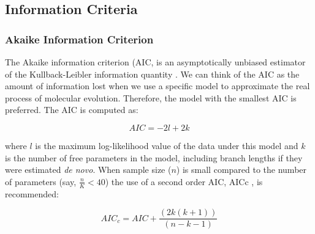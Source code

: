%
%
%
%

\subsection{Information Criteria}
\subsubsection{Akaike Information Criterion}
\label{sec:aic}

The Akaike information criterion (AIC, \citep{Akaike-1974} is an asymptotically
unbiased estimator of the Kullback-Leibler information quantity \citep{Kullback-1951}.
We can think of the AIC as the amount of information lost when we use a specific model
to approximate the real process of molecular evolution.
Therefore, the model with the smallest AIC is preferred. The AIC is computed as:

\[
AIC=-2l+2k
\]

where $l$ is the maximum log-likelihood value of the data under this model and $k$
is the number of free parameters in the model,
including branch lengths if they were estimated \emph{de novo}.
When sample size ($n$) is small compared to the number of parameters (say, $\frac{n}{K} < 40$)
the use of a second order AIC, AICc \citep{Sugiura-1978, Hurvich-1989}, is recommended:

\[
AIC_c=AIC+\frac{(2k(k+1))}{(n-k-1)}
\]

